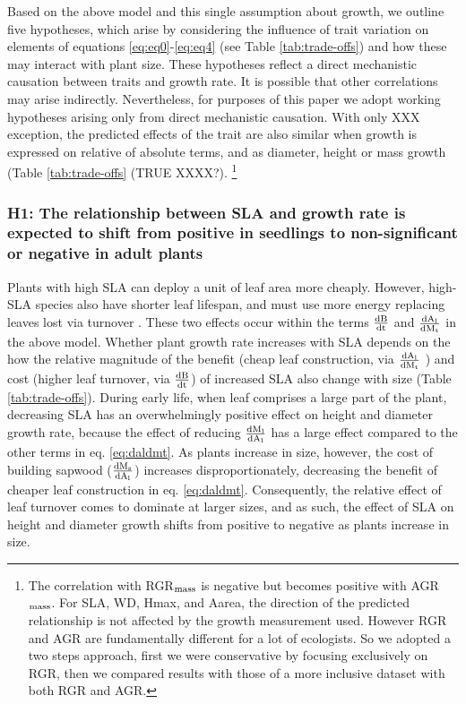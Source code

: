 \documentclass[a4paper,11pt]{article}
\newcommand{\ud}{\ensuremath{\rm{d}}}
\begin{document}
Based on the above model and this single assumption about growth, we outline five hypotheses, which arise by considering the influence of trait variation on elements of equations  \ref{eq:eq0}-\ref{eq:eq4} (see Table \ref{tab:trade-offs}) and how these may interact with plant size. These hypotheses reflect a direct mechanistic causation between traits and growth rate. It is possible that other correlations may arise indirectly. Nevertheless, for purposes of this paper we adopt working hypotheses arising only from direct mechanistic causation. With only XXX exception, the predicted effects of the trait are also similar when growth is expressed on relative of absolute terms, and as diameter, height or mass growth (Table \ref{tab:trade-offs} (TRUE XXXX?).
\footnote{The correlation with RGR$_{\rm mass}$ is negative but becomes positive with AGR$_{\rm mass}$. For SLA, WD, Hmax, and Aarea, the direction of the predicted relationship is not affected by the growth measurement used. However RGR and AGR are fundamentally different for a lot of ecologists. So we adopted a two steps approach, first we were conservative by focusing exclusively on RGR, then we compared results with those of a more inclusive dataset with both RGR and AGR.}


\subsubsection*{H1: The relationship between SLA and growth rate is expected to shift from positive in seedlings to non-significant or negative in adult plants}

Plants with high SLA can deploy a unit of leaf area more cheaply. However, high-SLA species also have shorter leaf lifespan, and must use more energy replacing leaves lost via turnover \citep{Wright:2004jb}. These two effects occur within the terms  $\frac{\ud B}{\ud t}$ and $\frac{\ud A_{\rm l}}{\ud M_{\rm t}}$ in the above model. Whether plant growth rate increases with SLA depends on the how the relative magnitude of the benefit (cheap leaf construction, via $\frac{\ud A_{\rm l}}{\ud M_{\rm t}}$ ) and cost (higher leaf turnover, via $\frac{\ud B}{\ud t}$) of increased SLA also change with size (Table \ref{tab:trade-offs}). During early life, when leaf comprises a large part of the plant, decreasing SLA has an overwhelmingly positive effect on height and diameter growth rate, because the effect of reducing $\frac{\ud M_{\rm l}}{\ud A_{\rm l}}$ has a large effect compared to the other terms in eq. \ref{eq:daldmt}. As plants increase in size, however, the cost of building sapwood ($\frac{\ud M_{\rm s}}{\ud A_{\rm l}}$) increases disproportionately, decreasing the benefit of cheaper leaf construction in eq.  \ref{eq:daldmt}. Consequently, the relative effect of leaf turnover comes to dominate at larger sizes, and as such, the effect of SLA on height and diameter growth shifts from positive to negative as plants increase in size.
\end{document}
